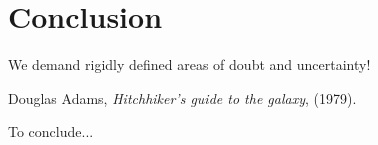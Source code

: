 \documentclass[11pt,twoside]{report}
\def\includebibliography{}
\begin{document}
\chapter{Conclusion}
\epigraph{We demand rigidly defined areas of doubt and uncertainty!}{Douglas Adams, \emph{Hitchhiker's guide to the galaxy}, (1979).}

To conclude...

\ifdefined\includebibliography
  \printbibliography
\fi
\end{document}
